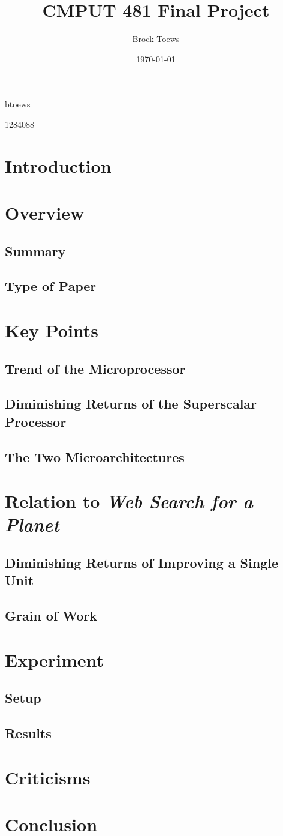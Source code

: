\documentclass[11pt]{article}
\title{CMPUT 481 Final Project}
\author{Brock Toews}
\date{\today}
\begin{document}
\maketitle
\begin{center}
btoews

1284088
\end{center}
\thispagestyle{empty}
\pagebreak
\setcounter{page}{1}
\listoffigures
\tableofcontents
\section{Introduction}
\section{Overview}
\subsection{Summary}
\subsection{Type of Paper}
\section{Key Points}
\subsection{Trend of the Microprocessor}
\subsection{Diminishing Returns of the Superscalar Processor}
\subsection{The Two Microarchitectures}
\section{Relation to \emph{Web Search for a Planet}}
\subsection{Diminishing Returns of Improving a Single Unit}
\subsection{Grain of Work}
\section{Experiment}
\subsection{Setup}
\subsection{Results}
\section{Criticisms}
\section{Conclusion}
\pagebreak
\end{document}
